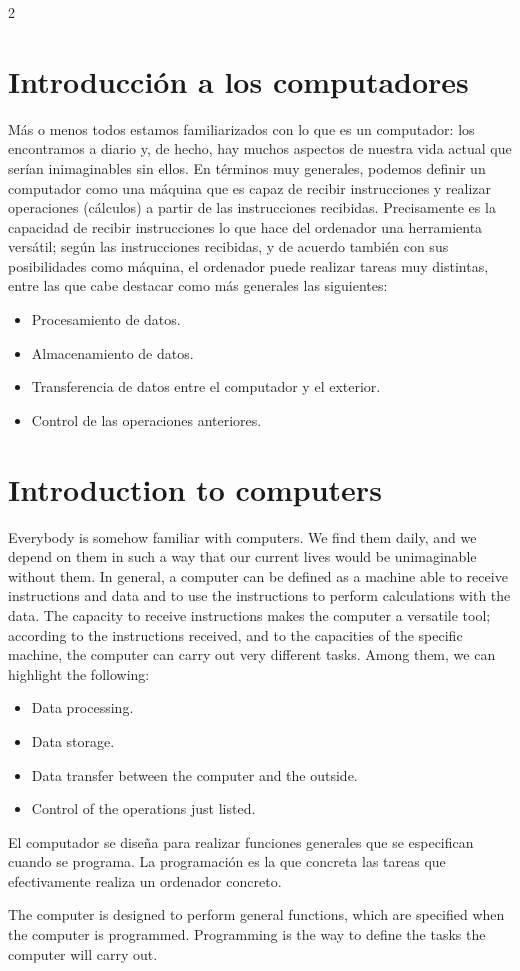\begin{paracol}{2}
\section{Introducción a los computadores}
Más o menos todos estamos familiarizados con lo que es un computador: los encontramos a diario y, de hecho, hay muchos aspectos de nuestra vida actual que serían inimaginables sin ellos. En términos muy generales, podemos definir un computador como una máquina que es capaz de recibir instrucciones y realizar operaciones (cálculos) a partir de las instrucciones recibidas. Precisamente es la capacidad de recibir instrucciones lo que hace del ordenador una herramienta versátil; según las instrucciones recibidas, y de acuerdo también con sus posibilidades como máquina, el ordenador puede realizar tareas muy distintas, entre las que cabe destacar como más generales las siguientes:
\begin{itemize}
\item Procesamiento de datos.
\item Almacenamiento de datos.
\item Transferencia de datos entre el computador y el exterior.
\item Control de las operaciones anteriores.
\end{itemize}

\switchcolumn
\section{Introduction to computers} 
Everybody is somehow familiar with computers. We find them daily, and we depend on them in such a way that our current lives would be unimaginable without them. In general, a computer can be defined as a machine able to receive instructions and data and to use the instructions to perform calculations with the data. The capacity to receive instructions makes the computer a versatile tool; according to the instructions received, and to the capacities of the specific machine, the computer can carry out very different tasks. Among them, we can highlight the following:
\begin{itemize}
\item Data processing.
\item Data storage.
\item Data transfer between the computer and the outside.
\item Control of the operations just listed.
\end{itemize}

\switchcolumn
El computador se diseña para realizar funciones generales que se especifican cuando se programa. La programación es la que concreta las tareas que efectivamente realiza un ordenador concreto.

\switchcolumn
The computer is designed to perform general functions, which are specified when the computer is programmed. Programming is the way to define the tasks the computer will carry out.

\end{paracol}
